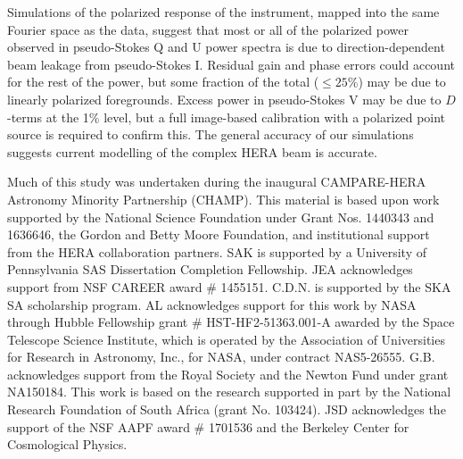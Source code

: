 \documentclass[twocolumn, trackchanges]{aastex61}
\begin{document}
Simulations of the polarized response of the instrument, mapped into the same Fourier space as the data, suggest that most or all of the polarized power observed in pseudo-Stokes Q and U power spectra is due to direction-dependent beam leakage from pseudo-Stokes I. Residual gain and phase errors could account for the rest of the power, but some fraction of the total ($\leqslant 25\%$) may be due to linearly polarized foregrounds. Excess power in pseudo-Stokes V may be due to $D$-terms at the 1\% level, but a full image-based calibration with a polarized point source is required to confirm this. The general accuracy of our simulations suggests current modelling of the complex HERA beam is accurate.

\acknowledgements

Much of this study was undertaken during the inaugural CAMPARE-HERA Astronomy Minority Partnership (CHAMP).
This material is based upon work supported by the National Science Foundation under Grant Nos. 1440343 and 1636646, the Gordon and Betty Moore Foundation, and institutional support from the HERA collaboration partners.
SAK is supported by a University of Pennsylvania SAS Dissertation Completion Fellowship.
JEA acknowledges support from NSF CAREER award \# 1455151.
C.D.N. is supported by the SKA SA scholarship program.
AL acknowledges support for this work by NASA through Hubble Fellowship grant \# HST-HF2-51363.001-A awarded by the Space Telescope Science Institute, which is operated by the Association of Universities for Research in Astronomy, Inc., for NASA, under contract NAS5-26555.
G.B. acknowledges support from the Royal Society and the Newton Fund under grant NA150184. This work is based on the research supported in part by the National Research Foundation of South Africa (grant No. 103424).
JSD acknowledges the support of the NSF AAPF award \# 1701536 and the Berkeley Center for Cosmological Physics.




\end{document}
